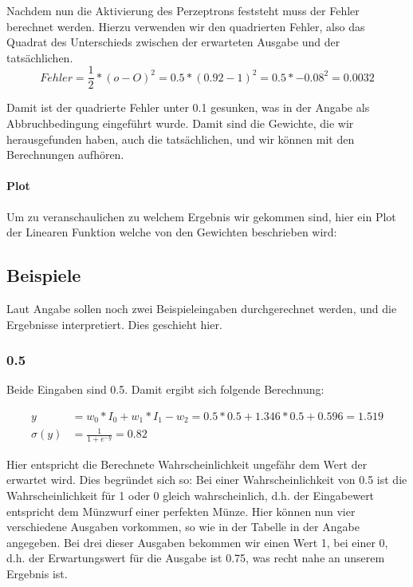 \documentclass[a4paper]{article}
\begin{document}
Nachdem nun die Aktivierung des Perzeptrons feststeht muss der Fehler berechnet werden. Hierzu verwenden wir den quadrierten Fehler, also das Quadrat des Unterschieds zwischen der erwarteten Ausgabe und der tatsächlichen.
\[
	Fehler = \frac{1}{2} * (o - O)^2 = 0.5 * (0.92 - 1)^2 = 0.5 * -0.08^2 = 0.0032
\]

Damit ist der quadrierte Fehler unter 0.1 gesunken, was in der Angabe als Abbruchbedingung eingeführt wurde. Damit sind die Gewichte, die wir herausgefunden haben, auch die tatsächlichen, und wir können mit den Berechnungen aufhören.

\paragraph{Plot}
Um zu veranschaulichen zu welchem Ergebnis wir gekommen sind, hier ein Plot der Linearen Funktion welche von den Gewichten beschrieben wird:


\subsection{Beispiele}
Laut Angabe sollen noch zwei Beispieleingaben durchgerechnet werden, und die Ergebnisse interpretiert. Dies geschieht hier.

\subsubsection{0.5}
Beide Eingaben sind 0.5. Damit ergibt sich folgende Berechnung:

\begin{align*}
	y &= w_0 * I_0 + w_1 * I_1 - w_2 = 0.5 * 0.5 + 1.346 * 0.5 + 0.596 = 1.519 \\
	\sigma(y) &= \frac{1}{1 + e^{-y}} = 0.82
\end{align*}

Hier entspricht die Berechnete Wahrscheinlichkeit ungefähr dem Wert der erwartet wird. Dies begründet sich so: Bei einer Wahrscheinlichkeit von 0.5 ist die Wahrscheinlichkeit für 1 oder 0 gleich wahrscheinlich, d.h. der Eingabewert entspricht dem Münzwurf einer perfekten Münze. Hier können nun vier verschiedene Ausgaben vorkommen, so wie in der Tabelle in der Angabe angegeben. Bei drei dieser Ausgaben bekommen wir einen Wert 1, bei einer 0, d.h. der Erwartungswert für die Ausgabe ist 0.75, was recht nahe an unserem Ergebnis ist.
\end{document}
